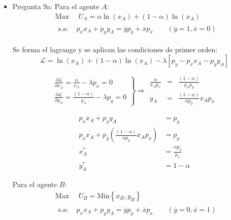 \begin{itemize}
	\item Pregunta 9a:
			Para el agente $A$:
				\begin{align*}
					& \text{Max } \quad U_A = \alpha \ln(x_A) + (1-\alpha)\ln(x_A) \\[0.2cm]
					& \begin{array}{ll}
						\text{s.a: } & p_xx_A + p_yy_A = \overline{y}p_y + \overline{x}p_x \qquad (\overline{y}=1, \overline{x}=0)
					\end{array}
				\end{align*}
			
			Se forma el lagrange y se aplican las condiciones de primer orden:
			$$ \mathscr{L} =  \ln(x_A) + (1-\alpha)\ln(x_A) - \lambda\left[p_y - p_xx_A - p_yy_A  \right]$$
			
				$$\left.
					\begin{array}{l}
						\frac{\partial \mathscr{L}}{\partial x_{A}} = \frac{\alpha}{x_A} - \lambda p_x= 0\\[0.4cm]
						\frac{\partial \mathscr{L}}{\partial y_{A}} = \frac{(1-\alpha)}{y_A} - \lambda p_y=0
					\end{array}
				  \right\} \Longrightarrow 
				    \begin{array}{ccc}
						\frac{\alpha}{x_Ap_x} & = & \frac{(1-\alpha)}{y_Ap_y}  \\[0.3cm]
				  		y_A & = & \frac{(1-\alpha)}{\alpha p_y}x_Ap_x
				    \end{array}$$
			
				\begin{align*}
					p_xx_A + p_yy_A & = p_y\\[0.3cm]
					p_xx_A + p_y\left( \frac{(1-\alpha)}{\alpha p_y}x_Ap_x\right)  & = p_y\\[0.3cm]
					x_{A}^* & = \frac{\alpha p_y}{p_x}\\[0.3cm]
					y_{A}^* & = 1 - \alpha
				\end{align*}
			
			Para el agente $B$:
				\begin{align*}
					& \text{Max } \quad U_B = \text{Min} \left\lbrace x_B, y_B\right\rbrace \\[0.2cm]
					& \begin{array}{ll}
						\text{s.a: } & p_xx_A + p_yy_A = \overline{y}p_y + \overline{x}p_x  \qquad (\overline{y}=0, \overline{x}=1)
					  \end{array}
				\end{align*}
			

\end{itemize}
